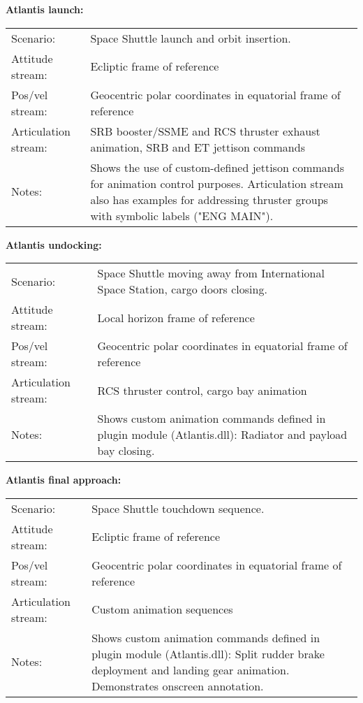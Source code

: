 \documentclass[Orbiter Technical Reference.tex]{subfiles}
\begin{document}
\noindent
\textbf{Atlantis launch:}
\begin{table}[H]
	\centering
	\begin{tabularx}{\textwidth}{ l X }
	Scenario: & Space Shuttle launch and orbit insertion.\\
	Attitude stream: & Ecliptic frame of reference\\
	Pos/vel stream: & Geocentric polar coordinates in equatorial frame of reference\\
	Articulation stream: & SRB booster/SSME and RCS thruster exhaust animation, SRB and ET jettison commands\\
	Notes: & Shows the use of custom-defined jettison commands for animation control purposes. Articulation stream also has examples for addressing thruster groups with symbolic labels ("ENG MAIN").\\
	\end{tabularx}
\end{table}

\noindent
\textbf{Atlantis undocking:}
\begin{table}[H]
	\centering
	\begin{tabularx}{\textwidth}{ l X }
	Scenario: & Space Shuttle moving away from International Space Station, cargo doors closing.\\
	Attitude stream: & Local horizon frame of reference\\
	Pos/vel stream: & Geocentric polar coordinates in equatorial frame of reference\\
	Articulation stream: & RCS thruster control, cargo bay animation\\
	Notes: & Shows custom animation commands defined in plugin module (Atlantis.dll): Radiator and payload bay closing.\\
	\end{tabularx}
\end{table}

\noindent
\textbf{Atlantis final approach:}
\begin{table}[H]
	\centering
	\begin{tabularx}{\textwidth}{ l X }
	Scenario: & Space Shuttle touchdown sequence.\\
	Attitude stream: & Ecliptic frame of reference\\
	Pos/vel stream: & Geocentric polar coordinates in equatorial frame of reference\\
	Articulation stream: & Custom animation sequences\\
	Notes: & Shows custom animation commands defined in plugin module (Atlantis.dll): Split rudder brake deployment and landing gear animation. Demonstrates onscreen annotation.\\
	\end{tabularx}
\end{table}
\end{document}
